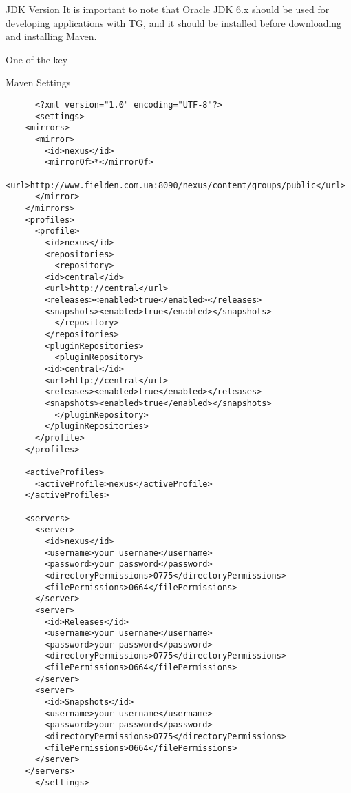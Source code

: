   \begin{notebox}{JDK Version}{\label{mb:java}}
    It is important to note that Oracle JDK 6.x should be used for developing applications with TG, and it should be installed before downloading and installing Maven. 
  \end{notebox}
  
  One of the key 

  \begin{code}{Maven Settings}{\label{lst:settings}}
    \begin{lstlisting}
      <?xml version="1.0" encoding="UTF-8"?>
      <settings>
	<mirrors>
	  <mirror>
	    <id>nexus</id>
	    <mirrorOf>*</mirrorOf>
	    <url>http://www.fielden.com.ua:8090/nexus/content/groups/public</url>
	  </mirror>
	</mirrors>
	<profiles>
	  <profile>
	    <id>nexus</id>
	    <repositories>
	      <repository>
		<id>central</id>
		<url>http://central</url>
		<releases><enabled>true</enabled></releases>
		<snapshots><enabled>true</enabled></snapshots>
	      </repository>
	    </repositories>
	    <pluginRepositories>
	      <pluginRepository>
		<id>central</id>
		<url>http://central</url>
		<releases><enabled>true</enabled></releases>
		<snapshots><enabled>true</enabled></snapshots>
	      </pluginRepository>
	    </pluginRepositories>
	  </profile>
	</profiles>

	<activeProfiles>
	  <activeProfile>nexus</activeProfile>
	</activeProfiles>

	<servers>
	  <server>
	    <id>nexus</id>
	    <username>your username</username>
	    <password>your password</password>
	    <directoryPermissions>0775</directoryPermissions>
	    <filePermissions>0664</filePermissions>
	  </server>
	  <server>
	    <id>Releases</id>
	    <username>your username</username>
	    <password>your password</password>
	    <directoryPermissions>0775</directoryPermissions>
	    <filePermissions>0664</filePermissions>
	  </server>
	  <server>
	    <id>Snapshots</id>
	    <username>your username</username>
	    <password>your password</password>
	    <directoryPermissions>0775</directoryPermissions>
	    <filePermissions>0664</filePermissions>
	  </server>
	</servers>
      </settings>
    \end{lstlisting}
  \end{code}


